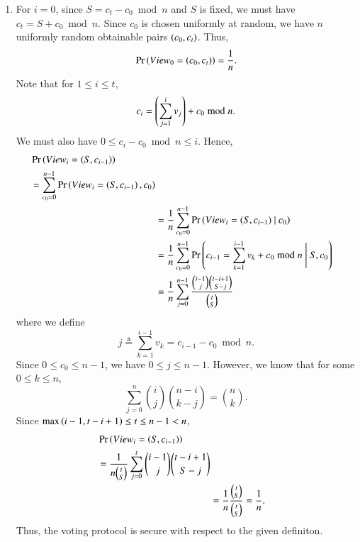 \documentclass[journal,12pt,twocolumn]{IEEEtran}
\begin{document}
\begin{enumerate}
\begin{enumerate}
        \item For \(i = 0\), since \(S = c_t - c_0 \bmod{n}\) and \(S\) is
        fixed, we must have \(c_t = S + c_0 \bmod{n}\). Since \(c_0\) is chosen
        uniformly at random, we have \(n\) uniformly random obtainable pairs
        \(\left(c_0, c_t\right)\). Thus,
            \begin{equation}
                \Pr\left(View_0 = \left(c_0, c_t\right)\right) = \frac{1}{n}.
            \end{equation}
        Note that for \(1 \le i \le t\),
            \begin{equation}
                c_i = \left(\sum_{j=1}^iv_j\right) + c_0 \bmod{n}.
            \end{equation}
        We must also have \(0 \le c_i - c_0 \bmod{n} \le i\). Hence,
            \begin{align}
                \begin{split}
                &\Pr\left(View_i = \left(S, c_{i-1}\right)\right) \\
                &= \sum_{c_0=0}^{n-1}\Pr\left(View_i = \left(S, c_{i-1}\right), c_0\right)
                \end{split} \\
                &= \frac{1}{n}\sum_{c_0=0}^{n-1}\Pr\left(View_i = (S, c_{i-1})\ |\ c_0\right) \\
                &= \frac{1}{n}\sum_{c_0=0}^{n-1}\Pr\left(c_{i-1} = \sum_{k=1}^{i-1}v_k + c_0 \bmod{n}\ \Bigg|\ S, c_0\right) \\
                &= \frac{1}{n}\sum_{j=0}^{n-1}\frac{\binom{i-1}{j}\binom{t-i+1}{S-j}}{\binom{t}{S}}
            \end{align}
        where we define
            \begin{equation}
                j \triangleq \sum_{k=1}^{i-1}v_k = c_{i-1} - c_0 \bmod{n}.
            \end{equation}
        Since \(0 \le c_0 \le n-1\), we have \(0 \le j \le n-1\). However, we
        know that for some \(0 \le k \le n\),
            \begin{equation}
                \sum_{j=0}^{n}\binom{i}{j}\binom{n-i}{k-j} = \binom{n}{k}.
                \label{eq:bino-binom}
            \end{equation}
        Since \(\max\left(i-1,t-i+1\right) \le t \le n - 1 < n\),
            \begin{align}
                \begin{split}
                    &\Pr\left(View_i = \left(S, c_{i-1}\right)\right) \\
                    &= \frac{1}{n\binom{t}{S}}\sum_{j=0}^{t}\binom{i-1}{j}\binom{t-i+1}{S-j}
                \end{split} \\
                &= \frac{1}{n}\frac{\binom{t}{S}}{\binom{t}{S}} = \frac{1}{n}.
            \end{align}
        Thus, the voting protocol is secure with respect to the given definiton.
        

\end{enumerate}
\end{enumerate}
\end{document}
